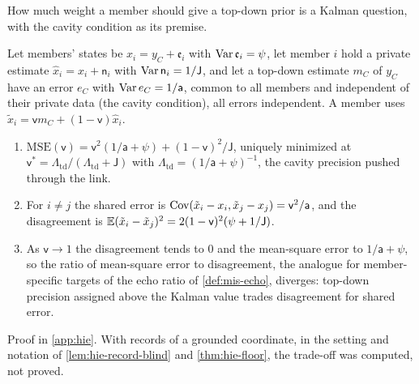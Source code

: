 How much weight a member should give a top-down prior is a Kalman question, with the cavity condition as its premise.

\begin{proposition}\label{prop:hie-echo-tradeoff}
Let members' states be $x_i=y_C+\mathfrak e_i$ with $\operatorname{Var}\mathfrak e_i=\psi$, let member $i$ hold a private estimate $\hat x_i=x_i+\mathsf n_i$ with $\operatorname{Var}\mathsf n_i=1/\mathsf J$, and let a top-down estimate $m_C$ of $y_C$ have an error $e_C$ with $\operatorname{Var} e_C=1/\mathsf a$, common to all members and independent of their private data (the cavity condition), all errors independent. A member uses $\tilde x_i=\mathsf vm_C+(1-\mathsf v)\hat x_i$.
\begin{enumerate}
\item[(a)] $\mathrm{MSE}(\mathsf v)=\mathsf v^2(1/\mathsf a+\psi)+(1-\mathsf v)^2/\mathsf J$, uniquely minimized at $\mathsf v^\ast=\Lambda_{\mathrm{td}}/(\Lambda_{\mathrm{td}}+\mathsf J)$ with $\Lambda_{\mathrm{td}}=(1/\mathsf a+\psi)^{-1}$, the cavity precision pushed through the link.
\item[(b)] For $i\neq j$ the shared error is $\operatorname{Cov}(\tilde x_i-x_i,\tilde x_j-x_j)=\mathsf v^2/\mathsf a$, and the disagreement is $\mathbb{E}(\tilde x_i-\tilde x_j)^2=2(1-\mathsf v)^2(\psi+1/\mathsf J)$.
\item[(c)] As $\mathsf v\to1$ the disagreement tends to $0$ and the mean-square error to $1/\mathsf a+\psi$, so the ratio of mean-square error to disagreement, the analogue for member-specific targets of the echo ratio of \cref{def:mis-echo}, diverges: top-down precision assigned above the Kalman value trades disagreement for shared error.
\end{enumerate}
\end{proposition}

Proof in \cref{app:hie}. With records of a grounded coordinate, in the setting and notation of \cref{lem:hie-record-blind} and \cref{thm:hie-floor}, the trade-off was computed, not proved.

